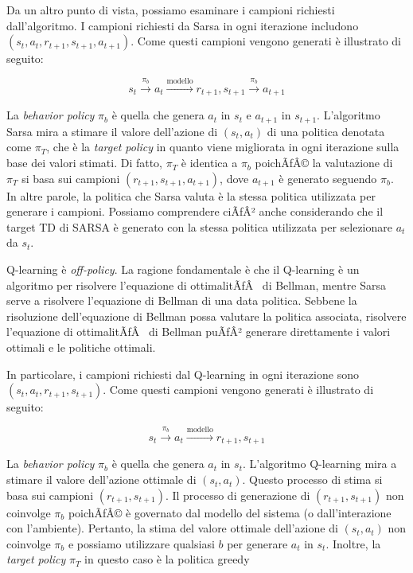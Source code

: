 ﻿\documentclass[11pt, a4paper]{report}
\begin{document}
Da un altro punto di vista, possiamo esaminare i campioni richiesti dall'algoritmo. I campioni richiesti da Sarsa in ogni iterazione includono $(s_t, a_t, r_{t+1}, s_{t+1}, a_{t+1})$. Come questi campioni vengono generati è illustrato di seguito:

\[
s_t \xrightarrow{\pi_b} a_t \xrightarrow{\text{modello}} r_{t+1}, s_{t+1} \xrightarrow{\pi_b} a_{t+1} \tag{5.12}
\]

La \emph{behavior policy} $\pi_b$ è quella che genera $a_t$ in $s_t$ e $a_{t+1}$ in $s_{t+1}$. L'algoritmo Sarsa mira a stimare il valore dell'azione di $(s_t, a_t)$ di una politica denotata come $\pi_T$, che è la \emph{target policy} in quanto viene migliorata in ogni iterazione sulla base dei valori stimati. Di fatto, $\pi_T$ è identica a $\pi_b$ poichÃƒÂ© la valutazione di $\pi_T$ si basa sui campioni $(r_{t+1}, s_{t+1}, a_{t+1})$, dove $a_{t+1}$ è generato seguendo $\pi_b$. In altre parole, la politica che Sarsa valuta è la stessa politica utilizzata per generare i campioni. Possiamo comprendere ciÃƒÂ² anche considerando che il target TD di SARSA è generato con la stessa politica utilizzata per selezionare $a_t$ da $s_t$.

Q-learning è \emph{off-policy}. La ragione fondamentale è che il Q-learning è un algoritmo per risolvere l'equazione di ottimalitÃƒÂ  di Bellman, mentre Sarsa serve a risolvere l'equazione di Bellman di una data politica. Sebbene la risoluzione dell'equazione di Bellman possa valutare la politica associata, risolvere l'equazione di ottimalitÃƒÂ  di Bellman puÃƒÂ² generare direttamente i valori ottimali e le politiche ottimali.

In particolare, i campioni richiesti dal Q-learning in ogni iterazione sono $(s_t, a_t, r_{t+1}, s_{t+1})$. Come questi campioni vengono generati è illustrato di seguito:

\[
s_t \xrightarrow{\pi_b} a_t \xrightarrow{\text{modello}} r_{t+1}, s_{t+1} \tag{5.13}
\]

La \emph{behavior policy} $\pi_b$ è quella che genera $a_t$ in $s_t$. L'algoritmo Q-learning mira a stimare il valore dell'azione ottimale di $(s_t, a_t)$. Questo processo di stima si basa sui campioni $(r_{t+1}, s_{t+1})$. Il processo di generazione di $(r_{t+1}, s_{t+1})$ non coinvolge $\pi_b$ poichÃƒÂ© è governato dal modello del sistema (o dall'interazione con l'ambiente). Pertanto, la stima del valore ottimale dell'azione di $(s_t, a_t)$ non coinvolge $\pi_b$ e possiamo utilizzare qualsiasi $b$ per generare $a_t$ in $s_t$. Inoltre, la \emph{target policy} $\pi_T$ in questo caso è la politica greedy
\end{document}
